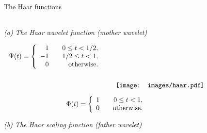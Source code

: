 \begin{figure}[H]
\caption{The Haar functions}\label{figure:haar}
\centering
\caption*{\\[1em]\footnotesize\textit{(a) The Haar wavelet function (mother
wavelet)}}
\[
\begin{aligned}
\Psi(t) = \left\{
	\begin{array}{r r}
		1  & \quad   0 \leq t < 1/2, \\
		-1 & \quad 1/2 \leq t < 1, \\
		0  & \quad \text{otherwise.}
	\end{array}
\right.
\end{aligned}
\qquad
\raisebox{-15mm}{\texttt{[image: images/haar.pdf]}}
\]
\caption*{\footnotesize\textit{(b) The Haar scaling function (father wavelet)}}
\[
\Phi(t) = \left\{
	\begin{array}{r r}
		1 & \quad 0 \leq t < 1, \\
		0 & \quad \text{otherwise.}
	\end{array}
\right.
\]
\end{figure}
